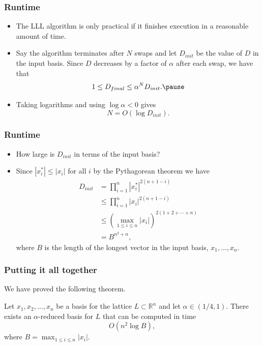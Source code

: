 \documentclass{beamer}
\newcommand{\reals}{\mathbb{R}}
\begin{document}
\begin{frame}
	\frametitle{Runtime}
	\begin{itemize}
		\item The LLL algorithm is only practical if it finishes execution in a reasonable amount of time.\pause
		\item Say the algorithm terminates after $N$ swaps and let $D_{init}$ be the value of $D$ in the input basis. Since $D$ decreases by a factor of $\alpha$ after each swap, we have that
		\[
		1\leq D_{final}\leq \alpha^ND_{init}.\pause
		\]
		\item Taking logarithms and using $\log \alpha <0$ gives
		\[
		N = O(\log D_{init}).
		\]
	\end{itemize}
\end{frame}

\begin{frame}
	\frametitle{Runtime}
	\begin{itemize}
		\item How large is $D_{init}$ in terms of the input basis?\pause
		\item Since $|x_i^*| \leq |x_i|$ for all $i$ by the Pythagorean theorem we have
		\begin{align*}
			D_{init} &= \prod_{i=1}^n|x_i^*|^{2(n+1-i)}\\
			&\leq \prod_{i=1}^n|x_i|^{2(n+1-i)}\\
			&\leq (\max_{1\leq i\leq n}|x_i|)^{2(1+2+\cdots +n)}\\
			&= B^{n^2+n},
		\end{align*}
		where $B$ is the length of the longest vector in the input basis, $x_1, \ldots, x_n$.
	\end{itemize}
\end{frame}

\begin{frame}
	\frametitle{Putting it all together}
	We have proved the following theorem.
	\begin{theorem}
		Let $x_1, x_2, \ldots, x_n$ be a basis for the lattice $L\subset \reals^n$ and let $\alpha \in (1/4, 1)$. There exists an $\alpha$-reduced basis for $L$ that can be computed in time
		\[
		O(n^2 \log B),
		\]
		where $B = \max_{1\leq i\leq n}|x_i|$.
	\end{theorem}
\end{frame}
\end{document}

